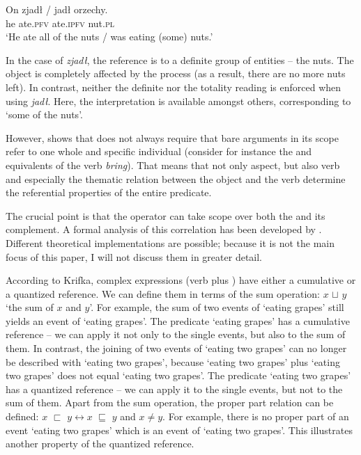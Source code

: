 \documentclass[output=paper,  modfonts,  newtxmath,  hidelinks		  ]{langscibook}
\begin{document}
\ea\label{21:8}
\gll On zjadł / jadł orzechy.\\
   he ate.\textsc{pfv} {} ate.\textsc{ipfv} nut.\textsc{pl}\\
\glt	`He ate all of the nuts / was eating (some) nuts.'
\z

\noindent In the case of \textit{zjadł}, the reference is to a definite group of entities -- the nuts. The object is completely affected by the  process (as a result, there are no more nuts left). In contrast, neither the definite nor the totality reading is enforced when using \textit{jadł}. Here, the  interpretation is available amongst others, corresponding to `some of the nuts'.\par However, \cite[128]{Filip2005} shows that  does not always require that bare  arguments in its scope refer to one whole and specific individual (consider for instance the   and  equivalents of the  verb \textit{bring}). That means that not only aspect, but also verb  and especially the thematic relation between the  object and the verb determine the referential properties of the entire predicate.\par 
The crucial point is that the  operator can take scope over both the  and its  complement. A formal analysis of this correlation has been developed by \cite{Krifka1989a,Krifka1989b,Krifka1992,Krifka1998}. Different theoretical implementations are possible; because it is not the main focus of this paper, I will not discuss them in greater detail.\par
According to Krifka, complex  expressions (verb plus ) have either a cumulative or a quantized reference. We can define them in terms of the sum operation: $x$ $\sqcup$ $y$ ‘the sum of $x$ and $y$’. For example, the sum of two events of ‘eating grapes’ still yields an event of ‘eating grapes’. The predicate ‘eating grapes’ has a cumulative reference – we can apply it not only to the single events, but also to the sum of them. In contrast, the joining of two events of ‘eating two grapes’ can no longer be described with ‘eating two grapes’, because ‘eating two grapes’ plus ‘eating two grapes’ does not equal ‘eating two grapes’. The predicate ‘eating two grapes’ has a quantized reference – we can apply it to the single events, but not to the sum of them. Apart from the sum operation, the proper part relation can be defined: $x$ $\sqsubset$ $y{}\leftrightarrow{}x$ $\sqsubseteq$ $y$ and $x\neq y$. For example, there is no proper part of an event ‘eating two grapes’ which is an event of ‘eating two grapes’. This illustrates another property of the quantized reference.
\end{document}
